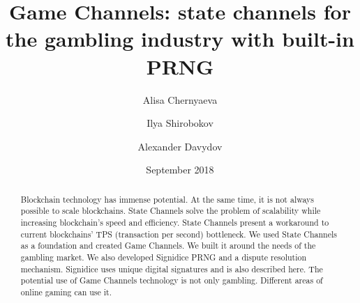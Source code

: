 \documentclass[tikz, 12pt]{article}
\title {Game Channels: state channels for the gambling industry with built-in PRNG}
\author {Alisa Chernyaeva}
\author{Ilya Shirobokov}
\author{Alexander Davydov}
\affil{Research department, DAO.Casino Company}
\affil{ \href{mailto:research@dao.casino}{research@dao.casino}}
\date {September 2018}
\theoremstyle{definition}
\theoremstyle{remark}
\begin{document}
\maketitle
	\begin{abstract}
Blockchain technology has immense potential. At the same time, it is not always possible to scale blockchains. State Channels solve the problem of scalability while increasing blockchain's speed and efficiency. State Channels present a workaround to current blockchains' TPS (transaction per second) bottleneck. We used State Channels as a foundation and created Game Channels. We built it around the needs of the gambling market. We also developed  Signidice PRNG and a dispute resolution mechanism. Signidice uses unique digital signatures and is also described here. The potential use of Game Channels technology is not only gambling. Different areas of online gaming can use it.

	\end{abstract}
\tableofcontents	
	
	
		
\end{document}
